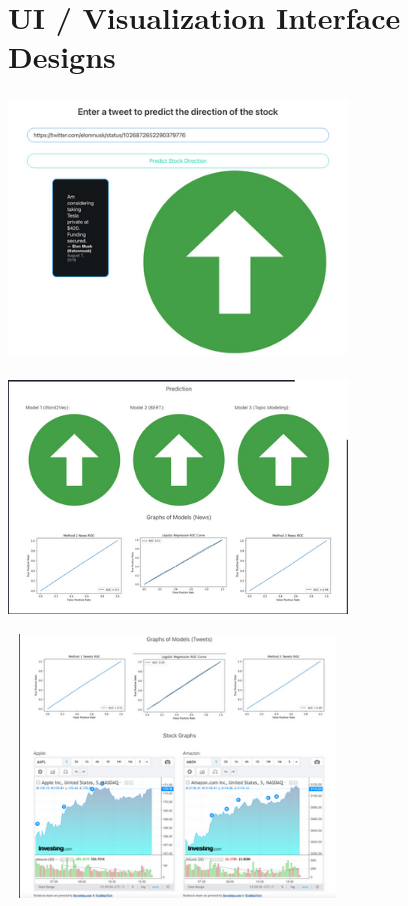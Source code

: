 \documentclass[conference]{IEEEtran}
\begin{document}
\section{UI / Visualization Interface Designs}
\includegraphics[width=9cm, height=7cm]{2.png}
\includegraphics[width=9cm, height=7cm]{1.png}
\includegraphics[width=9cm, height=7cm]{3.png}
\end{document}
